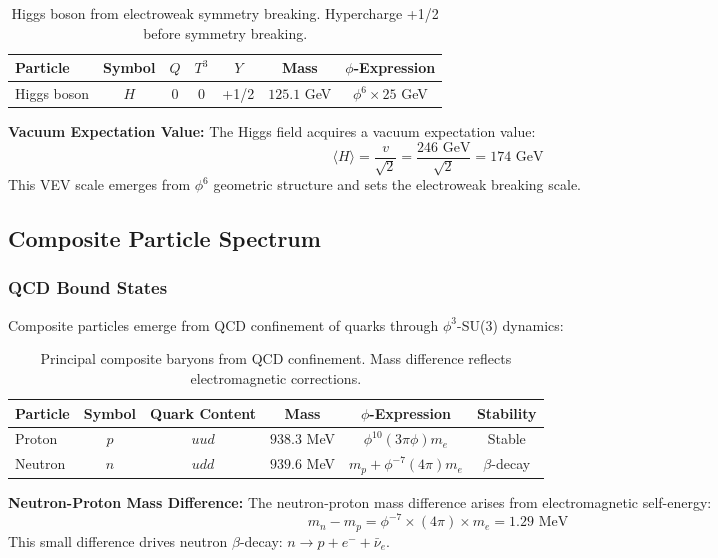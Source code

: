 \begin{table}[H]
\centering
\begin{tabular}{|l|c|c|c|c|c|c|}
\hline
\textbf{Particle} & \textbf{Symbol} & \textbf{$Q$} & \textbf{$T^3$} & \textbf{$Y$} & \textbf{Mass} & \textbf{$\phi$-Expression} \\
\hline
Higgs boson & $H$ & 0 & 0 & +1/2 & $125.1$ GeV & $\phi^6 \times 25$ GeV \\
\hline
\end{tabular}
\caption{Higgs boson from electroweak symmetry breaking. Hypercharge +1/2 before symmetry breaking.}
\end{table}

\textbf{Vacuum Expectation Value:}
The Higgs field acquires a vacuum expectation value:
\begin{equation}
\langle H \rangle = \frac{v}{\sqrt{2}} = \frac{246 \text{ GeV}}{\sqrt{2}} = 174 \text{ GeV}
\end{equation}
This VEV scale emerges from $\phi^6$ geometric structure and sets the electroweak breaking scale.

\subsection{Composite Particle Spectrum}

\subsubsection{QCD Bound States}

Composite particles emerge from QCD confinement of quarks through $\phi^3$-SU(3) dynamics:

\begin{table}[H]
\centering
\begin{tabular}{|l|c|c|c|c|c|}
\hline
\textbf{Particle} & \textbf{Symbol} & \textbf{Quark Content} & \textbf{Mass} & \textbf{$\phi$-Expression} & \textbf{Stability} \\
\hline
Proton & $p$ & $uud$ & $938.3$ MeV & $\phi^{10} (3\pi \phi) m_e$ & Stable \\
Neutron & $n$ & $udd$ & $939.6$ MeV & $m_p + \phi^{-7} (4\pi) m_e$ & $\beta$-decay \\
\hline
\end{tabular}
\caption{Principal composite baryons from QCD confinement. Mass difference reflects electromagnetic corrections.}
\end{table}

\textbf{Neutron-Proton Mass Difference:}
The neutron-proton mass difference arises from electromagnetic self-energy:
\begin{equation}
m_n - m_p = \phi^{-7} \times (4\pi) \times m_e = 1.29 \text{ MeV}
\end{equation}
This small difference drives neutron $\beta$-decay: $n \rightarrow p + e^- + \bar{\nu}_e$.

